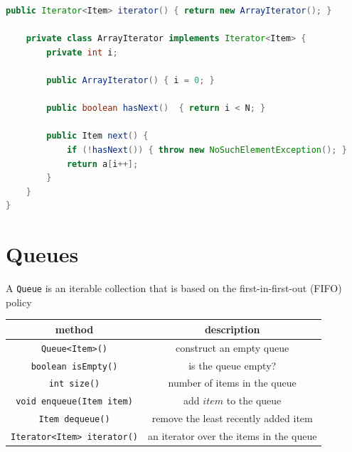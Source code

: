 \documentclass[8pt,a4paper,compress]{beamer}
\begin{document}
\begin{frame}[fragile]
\pause

\begin{lstlisting}[language=Java,style=focusin]
    public Iterator<Item> iterator() { return new ArrayIterator(); }

    private class ArrayIterator implements Iterator<Item> {
        private int i;
        
        public ArrayIterator() { i = 0; } 

        public boolean hasNext()  { return i < N; }
        
        public Item next() {
            if (!hasNext()) { throw new NoSuchElementException(); }
            return a[i++];
        }
    }
}
\end{lstlisting}
\end{frame}

\section{Queues}
\begin{frame}[fragile]
\pause

A \lstinline{Queue} is an iterable collection that is based on the first-in-first-out (FIFO) policy
\begin{center}
\begin{tabular}{cc}
method & description \\ \hline
\lstinline$Queue<Item>()$ & construct an empty queue \\
\lstinline$boolean isEmpty()$ & is the queue empty? \\
\lstinline$int size()$ & number of items in the queue \\
\lstinline$void enqueue(Item item)$ & add $item$ to the queue \\
\lstinline$Item dequeue()$ & remove the least recently added item \\
\lstinline$Iterator<Item> iterator()$ & an iterator over the items in the queue
\end{tabular} 
\end{center}
\end{frame}
\end{document}
